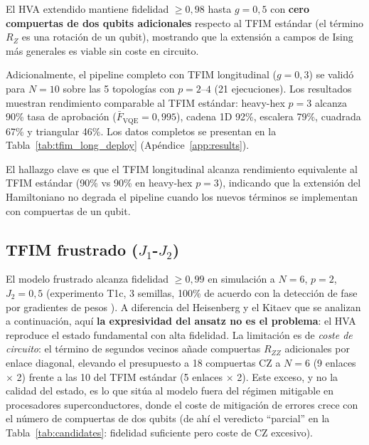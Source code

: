 \documentclass[11pt,a4paper,spanish]{book}
\begin{document}
El HVA extendido mantiene fidelidad $\geq 0,98$ hasta $g = 0,5$ con \textbf{cero compuertas de dos qubits adicionales} respecto al TFIM estándar (el término $R_Z$ es una rotación de un qubit), mostrando que la extensión a campos de Ising más generales es viable sin coste en circuito.

Adicionalmente, el pipeline completo con TFIM longitudinal ($g = 0,3$) se validó para $N = 10$ sobre las 5 topologías con $p = 2$--$4$ (21 ejecuciones). Los resultados muestran rendimiento comparable al TFIM estándar: heavy-hex $p=3$ alcanza 90\% tasa de aprobación ($\bar{F}_{\text{VQE}} = 0,995$), cadena 1D 92\%, escalera 79\%, cuadrada 67\% y triangular 46\%. Los datos completos se presentan en la Tabla~\ref{tab:tfim_long_deploy} (Apéndice~\ref{app:results}).

El hallazgo clave es que el TFIM longitudinal alcanza rendimiento equivalente al TFIM estándar (90\% vs 90\% en heavy-hex $p = 3$), indicando que la extensión del Hamiltoniano no degrada el pipeline cuando los nuevos términos se implementan con compuertas de un qubit.



\subsection{TFIM frustrado ($J_1$-$J_2$)}

El modelo frustrado alcanza fidelidad $\geq 0,99$ en simulación a $N = 6$, $p = 2$, $J_2 = 0,5$ (experimento T1c, 3 semillas, 100\% de acuerdo con la detección de fase por gradientes de pesos \citep{hernandes2025}). A diferencia del Heisenberg y el Kitaev que se analizan a continuación, aquí \textbf{la expresividad del ansatz no es el problema}: el HVA reproduce el estado fundamental con alta fidelidad. La limitación es de \emph{coste de circuito}: el término de segundos vecinos añade compuertas $R_{ZZ}$ adicionales por enlace diagonal, elevando el presupuesto a 18 compuertas CZ a $N = 6$ (9 enlaces $\times$ 2) frente a las 10 del TFIM estándar (5 enlaces $\times$ 2). Este exceso, y no la calidad del estado, es lo que sitúa al modelo fuera del régimen mitigable en procesadores superconductores, donde el coste de mitigación de errores crece con el número de compuertas de dos qubits \citep{tsubouchi2023} (de ahí el veredicto ``parcial'' en la Tabla~\ref{tab:candidates}: fidelidad suficiente pero coste de CZ excesivo).
\end{document}
